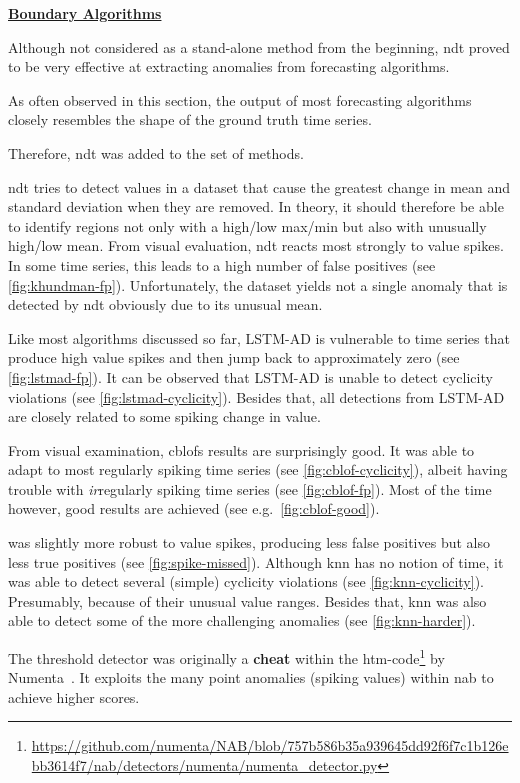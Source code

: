 \bigskip
{\large\uline{\textbf{Boundary Algorithms}}}\\
\begin{description}[style=unboxed,leftmargin=0cm]
    \item[Nonparametric Dynamic Thresholding~\cite{Hundman.2018}] Although not
    considered as a stand-alone method from the beginning, \gls{ndt} proved to be
    very effective at extracting anomalies from forecasting algorithms.
    
    As often observed in this section, the output of most forecasting algorithms
    closely resembles the shape of the ground truth time series.
    
    Therefore, \gls{ndt} was added to the set of methods.
    
    \gls{ndt} tries to detect values in a dataset that cause the greatest change
    in mean and standard deviation when they are removed. In theory, it should
    therefore be able to identify regions not only with a high/low max/min but also
    with unusually high/low mean. From visual evaluation, \gls{ndt} reacts most
    strongly to value spikes. In some time series, this leads to a high number
    of false positives (see \cref{fig:khundman-fp}). Unfortunately, the dataset
    yields not a single anomaly that is detected by \gls{ndt} obviously due to
    its unusual mean.
    \item[LSTM-AD] Like most algorithms discussed so far, LSTM-AD is vulnerable
    to time series that produce high value spikes and then jump back to approximately
    zero (see \cref{fig:lstmad-fp}). It can be observed that LSTM-AD is unable to detect
    cyclicity violations (see \cref{fig:lstmad-cyclicity}). Besides that, all
    detections from LSTM-AD are closely related to some spiking change in
    value.
    \item[CBLOF] From visual examination, \gls{cblof}s results are surprisingly
    good. It was able to adapt to most regularly spiking time series (see \cref{fig:cblof-cyclicity}),
    albeit having trouble with \textit{ir}regularly spiking time series (see \cref{fig:cblof-fp}).
    Most of the time however, good results are achieved (see e.g.\ \cref{fig:cblof-good}).
    \item[kNN] was slightly more robust to value spikes, producing
    less false positives but also less true positives (see \cref{fig:spike-missed}).
    Although \gls{knn} has no notion of time, it was able to detect several
    (simple) cyclicity violations (see \cref{fig:knn-cyclicity}). Presumably,
    because of their unusual value ranges. Besides that, \gls{knn} was also able
    to detect some of the more challenging anomalies (see \cref{fig:knn-harder}).
    \item[Threshold Detector] The threshold detector was originally a \textbf{cheat}
    within the \gls{htm}-code\footnote{\raggedright\url{https://github.com/numenta/NAB/blob/757b586b35a939645dd92f6f7c1b126ebb3614f7/nab/detectors/numenta/numenta_detector.py}}
    by Numenta~\cite{Lavin.2015,Ahmad.2017}. It exploits the many point anomalies
    (spiking values) within \gls{nab} to achieve higher scores.
    

\end{description}
